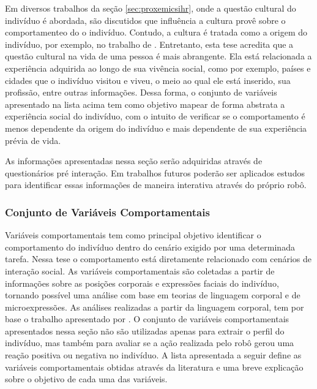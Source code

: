 Em diversos trabalhos da seção \ref{sec:proxemicsihr}, onde a questão cultural do indivíduo é abordada, são discutidos que influência a cultura provê sobre o comportamenteo do o indivíduo. Contudo, a cultura é tratada como a origem do indivíduo, por exemplo, no trabalho de . Entretanto, esta tese acredita que a questão cultural na vida de uma pessoa é mais abrangente. Ela está relacionada a experiência adquirida ao longo de sua vivência social, como por exemplo, países e cidades que o indivíduo visitou e viveu, o meio ao qual ele está inserido, sua profissão, entre outras informações. Dessa forma, o conjunto de variáveis apresentado na lista acima tem como objetivo mapear de forma abstrata a experiência social do indivíduo, com o intuito de verificar se o comportamento é menos dependente da origem do indivíduo e mais dependente de sua experiência prévia de vida.

As informações apresentadas nessa seção serão adquiridas através de questionários pré interação. Em trabalhos futuros poderão ser aplicados estudos para identificar essas informações de maneira interativa através do próprio robô.

\subsubsection{Conjunto de Variáveis Comportamentais}
\label{sec:variaveiscomportamentais}

Variáveis comportamentais tem como principal objetivo identificar o comportamento do indivíduo dentro do cenário exigido por uma determinada tarefa. Nessa tese o comportamento está diretamente relacionado com cenários de interação social. As variáveis comportamentais são coletadas a partir de informações sobre as posições corporais e expressões faciais do indivíduo, tornando possível uma análise com base em teorias de linguagem corporal e de microexpressões. As análises realizadas a partir da linguagem corporal, tem por base o trabalho apresentado por . O conjunto de variáveis comportamentais apresentados nessa seção não são utilizadas apenas para extrair o perfil do indivíduo, mas também para avaliar se a ação realizada pelo robô gerou uma reação positiva ou negativa no indivíduo. A lista apresentada a seguir define as variáveis comportamentais obtidas através da literatura e uma breve explicação sobre o objetivo de cada uma das variáveis.

